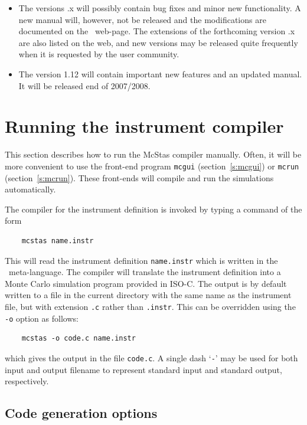 \begin{itemize}
\item The versions {\version}.x will possibly contain bug fixes and minor new functionality. A new manual
will, however, not be released and the modifications are documented on the
\MCS\ web-page. The extensions of the forthcoming version {\version}.x are also listed
on the web, and new versions may be released quite frequently when it is requested
by the user community.
\item The version 1.12 will contain important new features and an
  updated manual. It will be released end of 2007/2008.
\end{itemize}

\section{Running the instrument compiler}
\label{s:running}

This section describes how to run the McStas compiler manually. Often,
it will be more convenient to use the front-end program \verb+mcgui+
(section~\ref{s:mcgui}) or \verb+mcrun+ (section~\ref{s:mcrun}). These
front-ends will compile and run the simulations automatically.
 

The compiler for the \MCS{} instrument definition
is invoked by typing a command of the form
\begin{verbatim}
    mcstas name.instr
\end{verbatim}
This will read the instrument definition \verb+name.instr+ which is
written in the \MCS\ meta-language. The compiler will translate the
instrument definition into a Monte Carlo simulation program provided in
ISO-C. The output is by default written to a file in the current
directory with the same name as the instrument file, but with extension
\verb+.c+ rather than \verb+.instr+. This can be overridden using the
\verb+-o+ option as follows:
\begin{verbatim}
    mcstas -o code.c name.instr
\end{verbatim}
which gives the output in the file \verb+code.c+.
A single dash `\verb+-+' may be used for both input and output filename
to represent standard input and standard output, respectively.


\subsection{Code generation options}

